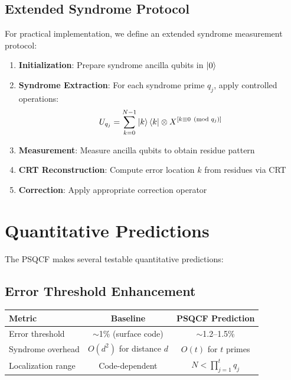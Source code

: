 \documentclass[12pt,a4paper]{article}
\begin{document}
\subsection{Extended Syndrome Protocol}

For practical implementation, we define an extended syndrome measurement protocol:

\begin{enumerate}
    \item \textbf{Initialization}: Prepare syndrome ancilla qubits in $\ket{0}$
    \item \textbf{Syndrome Extraction}: For each syndrome prime $q_j$, apply controlled operations:
    \begin{equation}
        U_{q_j} = \sum_{k=0}^{N-1} \ket{k}\bra{k} \otimes X^{[k \equiv 0 \pmod{q_j}]}
    \end{equation}
    \item \textbf{Measurement}: Measure ancilla qubits to obtain residue pattern
    \item \textbf{CRT Reconstruction}: Compute error location $k$ from residues via CRT
    \item \textbf{Correction}: Apply appropriate correction operator
\end{enumerate}

\section{Quantitative Predictions}
\label{sec:predictions}

The PSQCF makes several testable quantitative predictions:

\subsection{Error Threshold Enhancement}

\begin{center}
\begin{tabular}{p{3.5cm}cc}
\toprule
\textbf{Metric} & \textbf{Baseline} & \textbf{PSQCF Prediction} \\
\midrule
Error threshold & $\sim$1\% (surface code) & $\sim$1.2--1.5\% \\
Syndrome overhead & $O(d^2)$ for distance $d$ & $O(t)$ for $t$ primes \\
Localization range & Code-dependent & $N < \prod_{j=1}^t q_j$ \\
\bottomrule
\end{tabular}
\end{center}
\end{document}
